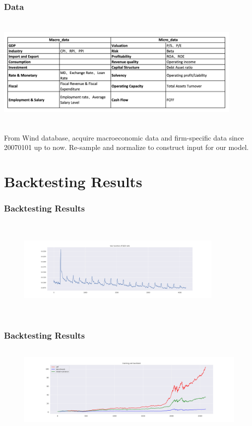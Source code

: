 \documentclass{beamer}
\begin{document}
\begin{frame}

\frametitle{Data}
\includegraphics[width=12cm,height=5.5cm]{data_table.png}

From Wind database, acquire macroeconomic data and firm-specific data since 20070101 up to now. Re-sample and normalize to construct input for our model.


\end{frame}
\section{Backtesting Results}
\begin{frame}
\frametitle{Backtesting Results}
\begin{figure}
   \includegraphics[width=10cm,height=5cm]{loss.jpg}
\end{figure}

\end{frame}

\begin{frame}
\frametitle{Backtesting Results}
\begin{figure}
   \includegraphics[width=12cm,height=4.3cm]{train.jpg}
\end{figure}
\end{frame}
\end{document}
